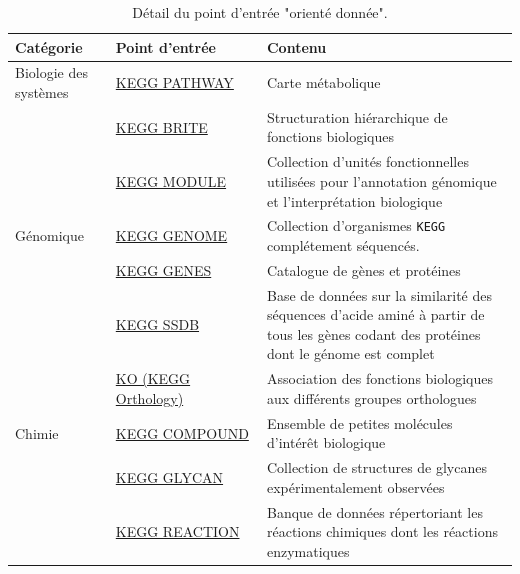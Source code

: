 \begin{refsegment}
    
    \begin{table}[H]
        \small
        \caption{Détail du point d'entrée "orienté donnée". }\label{tab:kegg_data_oriented}
        \label{tab:kegg_oriented_data} 
        \begin{tabular}{p{0.2\linewidth}|p{0.3\linewidth}|p{0.5\linewidth}}
            \toprule
            Catégorie               & Point d'entrée                                                        & Contenu \\
            \midrule
            Biologie des systèmes  & \href{http://www.genome.jp/kegg/pathway.html}{KEGG PATHWAY}            & Carte métabolique \\   
            \cline{2-3}
                                    & \href{http://www.genome.jp/kegg/brite.html}{KEGG BRITE}               & Structuration hiérarchique de fonctions biologiques \\
            \cline{2-3}             & \href{http://www.genome.jp/kegg/module.html}{KEGG MODULE}             & Collection d'unités fonctionnelles utilisées pour l'annotation génomique et l'interprétation biologique \\
            \hline
            Génomique               & \href{http://www.genome.jp/kegg/genome.html}{KEGG GENOME}             & Collection d'organismes \texttt{\gls{KEGG}} complétement séquencés. \\
            \cline{2-3}             & \href{http://www.genome.jp/kegg/genes.html}{KEGG GENES}               & Catalogue de gènes et protéines \\
            \cline{2-3}             & \href{http://www.kegg.jp/kegg/ssdb/}{KEGG SSDB}                       & Base de données sur la similarité des séquences d'acide aminé à partir de tous les gènes codant des protéines dont le génome est complet \\
            \cline{2-3}             & \href{http://www.genome.jp/kegg/ko.html}{KO (KEGG Orthology)}         & Association des fonctions biologiques aux différents groupes orthologues  \\
            \hline
            Chimie                  & \href{http://www.genome.jp/kegg/compound/}{KEGG COMPOUND}             & Ensemble de petites molécules d'intérêt biologique\\
            \cline{2-3}             & \href{http://www.genome.jp/kegg/glycan/}{KEGG GLYCAN}                 & Collection de structures de glycanes expérimentalement observées \\
            \cline{2-3}             & \href{http://www.genome.jp/kegg/reaction/}{KEGG REACTION}             & Banque de données répertoriant les réactions chimiques dont les réactions enzymatiques\\

\end{tabular}
\end{table}
\end{refsegment}
